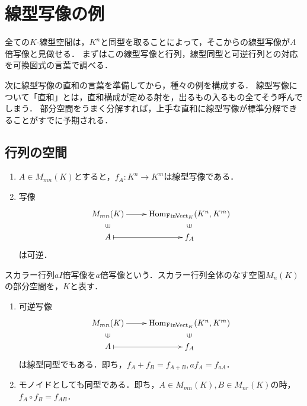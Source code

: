 \documentclass[uplatex, 12pt, dvipdfmx]{jsreport}
\begin{document}
\section{線型写像の例}

\begin{screen}
    全ての$K$-線型空間は，$K^n$と同型を取ることによって，そこからの線型写像が$A$倍写像と見做せる．
    まずはこの線型写像と行列，線型同型と可逆行列との対応を可換図式の言葉で調べる．

    次に線型写像の直和の言葉を準備してから，種々の例を構成する．
    線型写像について「直和」とは，直和構成が定める射を，出るもの入るもの全てそう呼んでしまう．
    部分空間をうまく分解すれば，上手な直和に線型写像が標準分解できることがすでに予期される．
\end{screen}

\subsection{行列の空間}

\begin{proposition}\mbox{}
    \begin{enumerate}
        \item $A\in M_{mn}(K)$とすると，$f_A:K^n\to K^m$は線型写像である．
        \item 写像
        \[\xymatrix@R-2pc{
            M_{mn}(K)\ar[r]&\Hom_{\FinVect_K}(K^n,K^m)\\
            \rotatebox[origin=c]{90}{$\in$}&\rotatebox[origin=c]{90}{$\in$}\\
            A\ar@{|->}[r]&f_A}\]は可逆．
    \end{enumerate}
\end{proposition}

\begin{definition}
    スカラー行列$aI$倍写像を$a$倍写像という．スカラー行列全体のなす空間$M_n(K)$の部分空間を，$K$と表す．
\end{definition}

\begin{proposition}\mbox{}
    \begin{enumerate}
        \item 可逆写像\[\xymatrix@R-2pc{
            M_{mn}(K)\ar[r]&\Hom_{\FinVect_K}(K^n,K^m)\\
            \rotatebox[origin=c]{90}{$\in$}&\rotatebox[origin=c]{90}{$\in$}\\
            A\ar@{|->}[r]&f_A}\]は線型同型でもある．即ち，$f_A+f_B=f_{A+B},af_A=f_{aA}$．
        \item モノイドとしても同型である．即ち，$A\in M_{mn}(K),B\in M_{nr}(K)$の時，$f_A\circ f_B=f_{AB}$．
    \end{enumerate}
\end{proposition}
\end{document}
